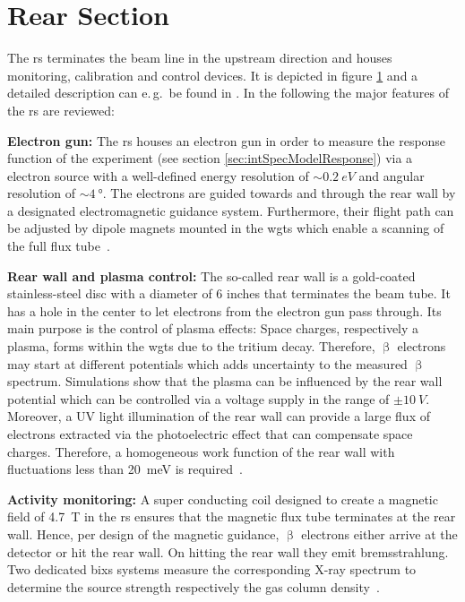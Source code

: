 \section{Rear Section}
\label{sec:katrinExpSetupRearSection}
\begin{figure}[t]
 \label{fig:rearSection}
\end{figure}

The \gls{rs} terminates the beam line in the upstream direction and houses monitoring, calibration and control devices. It is depicted in figure \ref{fig:rearSection} and a detailed description can e.\,g.~be found in \cite{Babutzka2014}. In the following the major features of the \gls{rs} are reviewed:

{\par\textbf{Electron gun:}
The \gls{rs} houses an electron gun in order to measure the response function of the experiment (see section \ref{sec:intSpecModelResponse}) via a electron source with a well-defined energy resolution of $\sim \SI{0.2}{eV}$ and angular resolution of $\sim \SI{4}{\degree}$. The electrons are guided towards and through the rear wall by a designated electromagnetic guidance system. Furthermore, their flight path can be adjusted by dipole magnets mounted in the \gls{wgts} which enable a scanning of the full flux tube~\cite{Babutzka2014}.}

{\par \textbf{Rear wall and plasma control:}
The so-called rear wall is a gold-coated stainless-steel disc with a diameter of 6 inches that terminates the beam tube. It has a hole in the center to let electrons from the electron gun pass through. Its main purpose is the control of plasma effects: Space charges, respectively a plasma, forms within the \gls{wgts} due to the tritium decay. Therefore, $\upbeta$ electrons may start at different potentials which adds uncertainty to the measured $\upbeta$ spectrum. Simulations show that the plasma can be influenced by the rear wall potential which can be controlled via a voltage supply in the range of $\pm \SI{10}{V}$. Moreover, a UV light illumination of the rear wall can provide a large flux of electrons extracted via the photoelectric effect that can compensate space charges. Therefore, a homogeneous work function of the rear wall with fluctuations less than \SI{20}{meV} is required~\cite{Kuckert2018, Kuckert2016}.}

{\par\textbf{Activity monitoring:}
A super conducting coil designed to create a magnetic field of \SI{4.7}{T} in the \gls{rs} ensures that the magnetic flux tube terminates at the rear wall. Hence, per design of the magnetic guidance, $\upbeta$ electrons either arrive at the detector or hit the rear wall. On hitting the rear wall they emit bremsstrahlung. Two dedicated \gls{bixs} systems measure the corresponding X-ray spectrum to determine the source strength respectively the gas column density~\cite{Roellig2015}.}

